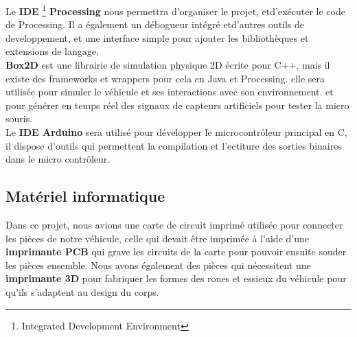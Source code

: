  
   Le \textbf{IDE} \footnote{Integrated Development Environment}
\textbf{Processing} nous permettra d'organiser le projet, etd'exécuter le
code de Processing.  Il a également un débogueur intégré etd'autres
outils de developpement, et une interface simple pour ajouter
les bibliothèques et extensions de langage. \\ 


   \textbf{Box2D} est une librairie de simulation physique 2D écrite pour C++,
mais il existe des frameworks et wrappers pour cela en Java et Processing.
elle sera utilisée pour simuler le véhicule et ses interactions avec son
environnement. et pour générer en temps réel des signaux de capteurs
artificiels pour tester la micro souris. \\


   Le \textbf{IDE Arduino} sera utilisé pour développer le microcontrôleur
principal en C, il dispose d'outils qui permettent la compilation et
l'ectiture des sorties binaires dans le micro contrôleur. \\

\subsection{Matériel informatique} \label{subsec:hardDev}
Dans ce projet, nous avions une carte de circuit imprimé utilisée pour
connecter les pièces de notre véhicule, celle qui devait être imprimée à l'aide
d'une \textbf{imprimante PCB} qui grave les circuits de la carte pour pouvoir
ensuite souder les pièces ensemble. Nous avons également des pièces qui
nécessitent une \textbf{imprimante 3D} pour fabriquer les formes des roues et
essieux du véhicule pour qu'ils s'adaptent au design du corps.    
